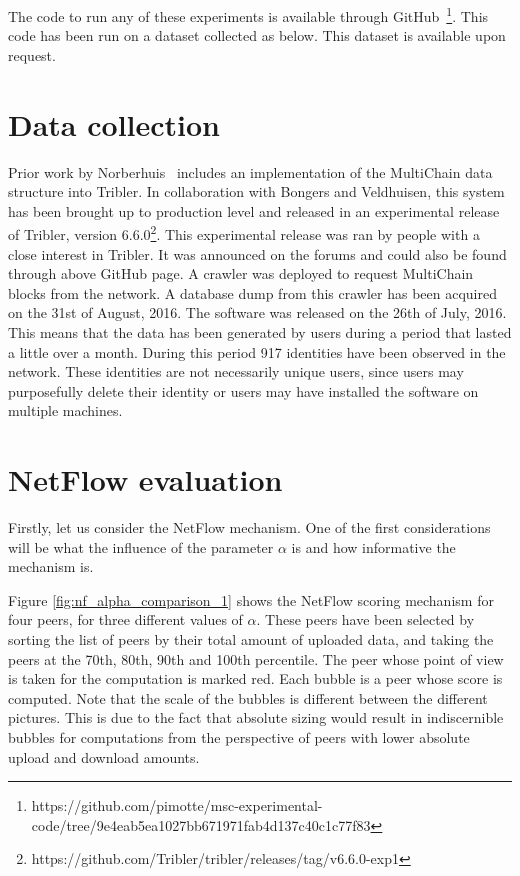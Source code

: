 \documentclass[a4paper,11pt]{book}
\theoremstyle{definition}
\begin{document}
The code to run any of these experiments is available through 
GitHub~\footnote{https://github.com/pimotte/msc-experimental-code/tree/9e4eab5ea1027bb671971fab4d137c40c1c77f83}.
This code has been run on a dataset collected as below. This dataset is available upon request.


\section{Data collection}

Prior work by Norberhuis~\cite{norberhuis2015multichain} includes
an implementation of the MultiChain data structure into Tribler. In collaboration with Bongers and Veldhuisen,
this system has been brought up to production level and released in an experimental release of Tribler,
version 6.6.0\footnote{https://github.com/Tribler/tribler/releases/tag/v6.6.0-exp1}. This experimental
release was ran by people with a close interest in Tribler. It was announced on the forums and could
also be found through above GitHub page. A crawler was deployed to request MultiChain blocks from 
the network. A database dump from this crawler has been acquired on the 31st of August, 2016. The software
was released on the 26th of July, 2016. This means that the data has been generated by users during a period
that lasted a little over a month. During this period 917 identities have been observed in the network.
These identities are not necessarily unique users, since users may purposefully 
delete their identity or users may have installed the software on multiple machines.

\section{NetFlow evaluation}

Firstly, let us consider the NetFlow mechanism. One of the first considerations will be what the influence
of the parameter $\alpha$ is and how informative the mechanism is.

Figure \ref{fig:nf_alpha_comparison_1} 
shows the NetFlow scoring mechanism for four peers, for three
different values of $\alpha$. 
These peers have been selected by sorting the list of peers by their total
amount of uploaded data, and taking the peers at the 70th, 80th, 90th and 100th percentile.
The peer whose point of view is taken for the computation is marked red. Each bubble is a peer whose
score is computed. Note that the scale of the bubbles is different between the different pictures. 
This is due to the fact that absolute sizing would result in indiscernible bubbles for computations
from the perspective of peers with lower absolute upload and download amounts. 
\end{document}
